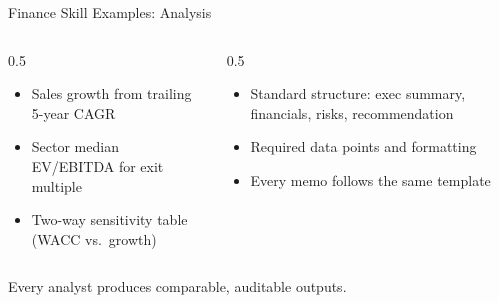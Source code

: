 \documentclass[aspectratio=169]{beamer}
\begin{document}
\begin{frame}{Finance Skill Examples: Analysis}
\begin{columns}[T]
\begin{column}{0.5\textwidth}
\begin{shadedbox}[title=\textbf{DCF Skill}]
\begin{itemize}\small
  \item Sales growth from trailing 5-year CAGR
  \item Sector median EV/EBITDA for exit multiple
  \item Two-way sensitivity table (WACC vs.\ growth)
\end{itemize}
\end{shadedbox}
\end{column}
\begin{column}{0.5\textwidth}
\begin{shadedbox}[title=\textbf{Investment Memo Skill}]
\begin{itemize}\small
  \item Standard structure: exec summary, financials, risks, recommendation
  \item Required data points and formatting
  \item Every memo follows the same template
\end{itemize}
\end{shadedbox}
\end{column}
\end{columns}
\vspace{0.3cm}
\alert{Every analyst produces comparable, auditable outputs.}
\end{frame}
\end{document}
